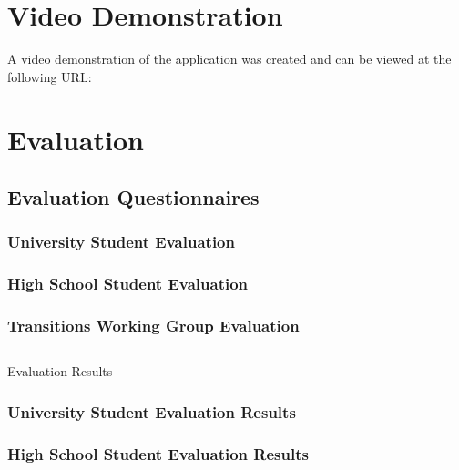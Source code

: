 \documentclass{l4proj}
\begin{document}
\begin{appendices}
\chapter{Video Demonstration} \label{app:video}
A video demonstration of the application was created and can be viewed at the following URL:
\newline
\url{}

\chapter{Evaluation} \label{app:eval}
\section{Evaluation Questionnaires} \label{app:evalSurvey}
\subsection{University Student Evaluation} \label{app:evalUni}


\subsection{High School Student Evaluation} \label{app:evalHigh}


\subsection{Transitions Working Group Evaluation} \label{app:evalTwg}


\section{}{Evaluation Results} \label{app:evalResults}
\subsection{University Student Evaluation Results} \label{app:evalUniResults}

 
\subsection{High School Student Evaluation Results} \label{app:evalHighResults}



\end{appendices}
\end{document}
